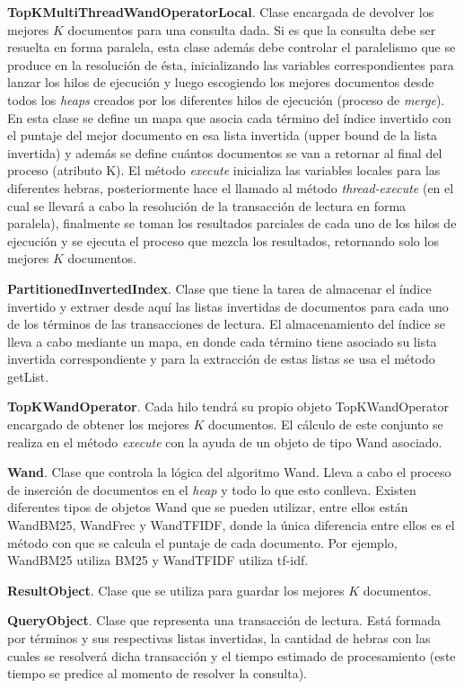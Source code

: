 \begin{list}{}{}
	\item \textbf{TopKMultiThreadWandOperatorLocal}. Clase encargada de devolver los mejores $K$ documentos para una consulta dada. Si es que la consulta debe ser resuelta en forma paralela, esta clase además debe controlar el paralelismo que se produce en la resolución de ésta, inicializando las variables correspondientes para lanzar los hilos de ejecución y luego escogiendo los mejores documentos desde todos los \textit{heaps} creados por los diferentes hilos de ejecución (proceso de \textit{merge}). En esta clase se define un mapa que asocia cada término del índice invertido con el puntaje del mejor documento en esa lista invertida (upper bound de la lista invertida) y además se define cuántos documentos se van a retornar al final del proceso (atributo K). El método \textit{execute} inicializa las variables locales para las diferentes hebras, posteriormente hace el llamado al método \emph{thread-execute} (en el cual se llevará a cabo la resolución de la transacción de lectura en forma paralela), finalmente se toman los resultados parciales de cada uno de los hilos de ejecución y se ejecuta el proceso que mezcla los resultados, retornando solo los mejores $K$ documentos. 
	
	\item \textbf{PartitionedInvertedIndex}. Clase que tiene la tarea de almacenar el índice invertido y extraer desde aquí las listas invertidas de documentos para cada uno de los términos de las transacciones de lectura. El almacenamiento del índice se lleva a cabo mediante un mapa, en donde cada término tiene asociado su lista invertida correspondiente y para la extracción de estas listas se usa el método getList.
	
	\item \textbf{TopKWandOperator}. Cada hilo tendrá su propio objeto TopKWandOperator encargado de obtener los mejores $K$ documentos. El cálculo de este conjunto se realiza en el método \textit{execute} con la ayuda de un objeto de tipo Wand asociado.
	
	\item \textbf{Wand}. Clase que controla la lógica del algoritmo Wand. Lleva a cabo el proceso de inserción de documentos en el \textit{heap} y todo lo que esto conlleva. Existen diferentes tipos de objetos Wand que se pueden utilizar, entre ellos están WandBM25, WandFrec y WandTFIDF, donde la única diferencia entre ellos es el método con que se calcula el puntaje de cada documento. Por ejemplo, WandBM25 utiliza BM25 y WandTFIDF utiliza tf-idf. 
	
	\item \textbf{ResultObject}. Clase que se utiliza para guardar los mejores $K$ documentos.
	
	\item \textbf{QueryObject}. Clase que representa una transacción de lectura. Está formada por términos y sus respectivas listas invertidas, la cantidad de hebras con las cuales se resolverá dicha transacción y el tiempo estimado de procesamiento (este tiempo se predice al momento de resolver la consulta).

\end{list}


